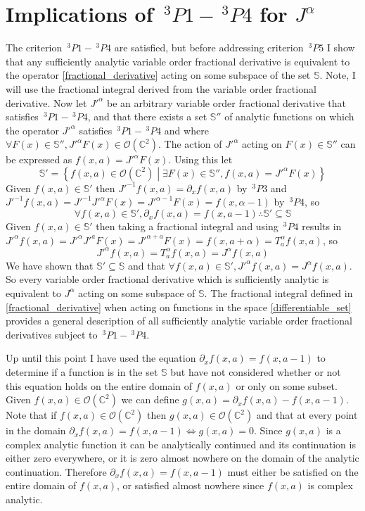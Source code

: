 \documentclass[%
 onecolumn,
 amsmath, amssymb, aps, pra, 10pt
]{revtex4-2}
\begin{document}
\section*{Implications of $\,^3P1 - \,^3P4$ for $J^{\alpha}$}
The criterion $\,^3P1 - \,^3P4$ are satisfied, but before addressing criterion $\,^3P5$ I show that any sufficiently analytic variable order fractional derivative is equivalent to the operator \eqref{fractional_derivative} acting on some subspace of the set $\mathbb{S}$. Note, I will use the fractional integral derived from the variable order fractional derivative. Now let $J'^{\alpha}$ be an arbitrary variable order fractional derivative that satisfies $\,^3P1 - \,^3P4$, and that there exists a set $\mathbb{S}''$ of analytic functions on which the operator $J'^{\alpha}$ satisfies $\,^3P1 - \,^3P4$ and where $\forall F(x) \in \mathbb{S}'', J'^{\alpha}F(x) \in \mathcal{O}(\mathbb{C}^2)$. The action of $J'^{\alpha}$ acting on $F(x) \in \mathbb{S}''$ can be expressed as $f(x, a) = J'^{\alpha} F(x)$. Using this let
$$\mathbb{S}' = \left\lbrace f(x, a) \in \mathcal{O}(\mathbb{C}^2) \middle| \exists F(x) \in \mathbb{S}'', f(x, a) = J'^{\alpha} F(x) \right\rbrace$$
Given $f(x, a) \in \mathbb{S}'$ then $J'^{-1}f(x, a) = \partial_x f(x, a)$ by $\,^3P3$ and $J'^{-1} f(x, a) = J'^{-1}J'^{\alpha} F(x) = J'^{\alpha - 1} F(x) = f(x, \alpha - 1)$ by $\,^3P4$, so
$$\forall f(x, a) \in \mathbb{S}', \partial_x f(x, a) = f(x, a - 1) \therefore \mathbb{S}' \subseteq \mathbb{S}$$
Given $f(x, a) \in \mathbb{S}'$ then taking a fractional integral and using $\,^3P4$ results in $J'^{\alpha} f(x, a) = J'^{\alpha}J'^{a} F(x) = J'^{\alpha + a} F(x) = f(x, a + \alpha) = T_{a}^{\alpha} f(x, a)$, so
$$J'^{\alpha} f(x,a) = T_{a}^{\alpha} f(x, a) = J^{\alpha} f(x, a)$$
We have shown that $\mathbb{S}' \subseteq \mathbb{S}$ and that $\forall f(x, a) \in \mathbb{S}', J'^{\alpha} f(x, a) = J^{\alpha} f(x, a)$. So every variable order fractional derivative which is sufficiently analytic is equivalent to $J^{\alpha}$ acting on some subspace of $\mathbb{S}$. The fractional integral defined in \eqref{fractional_derivative} when acting on functions in the space \eqref{differentiable_set} provides a general description of all sufficiently analytic variable order fractional derivatives subject to $\,^3P1 - \,^3P4$.

Up until this point I have used the equation $\partial_x f(x, a) = f(x, a - 1)$ to determine if a function is in the set $\mathbb{S}$ but have not considered whether or not this equation holds on the entire domain of $f(x, a)$ or only on some subset. Given $f(x, a) \in \mathcal{O}(\mathbb{C}^2)$ we can define $g(x, a) = \partial_x f(x, a) - f(x, a - 1)$. Note that if $f(x, a) \in \mathcal{O}(\mathbb{C}^2)$ then $g(x, a) \in \mathcal{O}(\mathbb{C}^2)$ and that at every point in the domain $\partial_x f(x, a) = f(x, a - 1) \iff g(x, a) = 0$. Since $g(x, a)$ is a complex analytic function it can be analytically continued and its continuation is either zero everywhere, or it is zero almost nowhere on the domain of the analytic continuation. Therefore $\partial_x f(x, a) = f(x, a - 1)$ must either be satisfied on the entire domain of $f(x, a)$, or satisfied almost nowhere since $f(x, a)$ is complex analytic.
\end{document}
